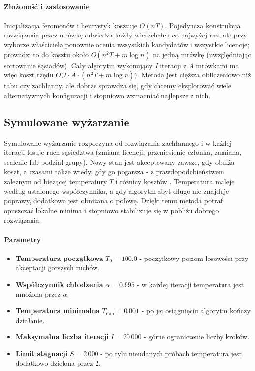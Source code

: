 \paragraph{Złożoność i zastosowanie}
Inicjalizacja feromonów i heurystyk kosztuje $O(nT)$. Pojedyncza konstrukcja rozwiązania przez mrówkę odwiedza każdy wierzchołek co najwyżej raz, ale przy wyborze właściciela ponownie ocenia wszystkich kandydatów i wszystkie licencje; prowadzi to do kosztu około $O(n^2 T + m\log n)$ na jedną mrówkę (uwzględniając sortowanie sąsiadów). Cały algorytm wykonujący $I$ iteracji z $A$ mrówkami ma więc koszt rzędu $O\bigl(I \cdot A \cdot (n^2 T + m\log n)\bigr)$. Metoda jest cięższa obliczeniowo niż tabu czy zachłanny, ale dobrze sprawdza się, gdy chcemy eksplorować wiele alternatywnych konfiguracji i stopniowo wzmacniać najlepsze z nich.

\subsection{Symulowane wyżarzanie }\label{subsec:sa}
Symulowane wyżarzanie rozpoczyna od rozwiązania zachłannego i w każdej iteracji losuje ruch sąsiedztwa (zmiana licencji, przeniesienie członka, zamiana, scalenie lub podział grupy). Nowy stan jest akceptowany zawsze, gdy obniża koszt, a czasami także wtedy, gdy go pogarsza - z prawdopodobieństwem zależnym od bieżącej temperatury \(T\) i różnicy kosztów \cite{kirkpatrick1983}. Temperatura maleje według ustalonego współczynnika, a gdy algorytm zbyt długo nie znajduje poprawy, dodatkowo jest obniżana o połowę. Dzięki temu metoda potrafi opuszczać lokalne minima i stopniowo stabilizuje się w pobliżu dobrego rozwiązania.

\paragraph{Parametry}
\begin{itemize}
  \item \textbf{Temperatura początkowa} $T_0 = 100.0$ - początkowy poziom losowości przy akceptacji gorszych ruchów.
  \item \textbf{Współczynnik chłodzenia} $\alpha = 0.995$ - w każdej iteracji temperatura jest mnożona przez $\alpha$.
  \item \textbf{Temperatura minimalna} $T_{\min} = 0.001$ - po jej osiągnięciu algorytm kończy działanie.
  \item \textbf{Maksymalna liczba iteracji} $I = 20\,000$ - górne ograniczenie liczby kroków.
  \item \textbf{Limit stagnacji} $S = 2\,000$ - po tylu nieudanych próbach temperatura jest dodatkowo dzielona przez 2.
\end{itemize}

